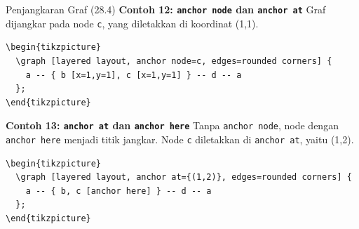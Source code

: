 \documentclass[aspectratio=169]{beamer}
\begin{document}
\begin{frame}{Penjangkaran Graf (28.4)}
\textbf{Contoh 12: \texttt{anchor node} dan \texttt{anchor at}}
Graf dijangkar pada node \texttt{c}, yang diletakkan di koordinat (1,1).
\begin{lstlisting}
\begin{tikzpicture}
  \graph [layered layout, anchor node=c, edges=rounded corners] {
    a -- { b [x=1,y=1], c [x=1,y=1] } -- d -- a
  };
\end{tikzpicture}
\end{lstlisting}
\begin{center}\end{center}


\textbf{Contoh 13: \texttt{anchor at} dan \texttt{anchor here}}
Tanpa \texttt{anchor node}, node dengan \texttt{anchor here} menjadi titik jangkar. Node \texttt{c} diletakkan di \texttt{anchor at}, yaitu (1,2).
\begin{lstlisting}
\begin{tikzpicture}
  \graph [layered layout, anchor at={(1,2)}, edges=rounded corners] {
    a -- { b, c [anchor here] } -- d -- a
  };
\end{tikzpicture}
\end{lstlisting}
\begin{center}\end{center}



\end{frame}
\end{document}
